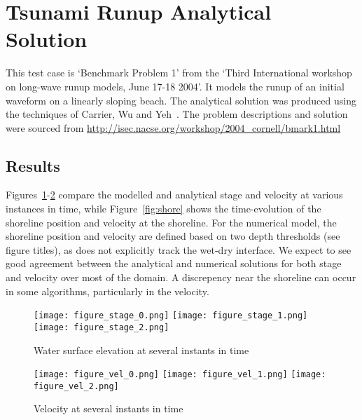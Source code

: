 \section{Tsunami Runup Analytical Solution}

This test case is `Benchmark Problem 1' from the `Third International workshop
on long-wave runup models, June 17-18 2004'. It models the runup of an initial
waveform on a linearly sloping beach. The analytical solution was produced 
using the techniques of Carrier, Wu and Yeh~\cite{CGY2003}. The problem descriptions 
and solution were sourced from \url{http://isec.nacse.org/workshop/2004\_cornell/bmark1.html}

\subsection{Results}

Figures~\ref{fig:stage}-\ref{fig:vel} compare the modelled and analytical stage
and velocity at various instances in time, while Figure~\ref{fig:shore} shows
the time-evolution of the shoreline position and velocity at the shoreline. For
the numerical model, the shoreline position and velocity are defined based on
two depth thresholds (see figure titles), as \anuga{} does not explicitly track
the wet-dry interface. We expect to see good agreement between the analytical
and numerical solutions for both stage and velocity over most of the domain.  A
discrepency near the shoreline can occur in some \anuga{} algorithms,
particularly in the velocity.


\begin{figure}
\begin{center}
\texttt{[image: figure\_stage\_0.png]}
\texttt{[image: figure\_stage\_1.png]}
\texttt{[image: figure\_stage\_2.png]}
\caption{Water surface elevation at several instants in time}
\label{fig:stage}
\end{center}
\end{figure}

\begin{figure}
\begin{center}
\texttt{[image: figure\_vel\_0.png]}
\texttt{[image: figure\_vel\_1.png]}
\texttt{[image: figure\_vel\_2.png]}
\caption{Velocity at several instants in time}
\label{fig:vel}
\end{center}
\end{figure}

